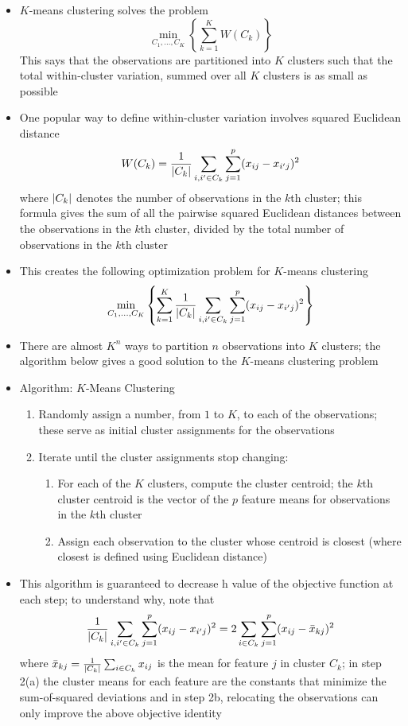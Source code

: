 \documentclass[12pt]{article}
\begin{document}
\begin{itemize}
\item $K$-means clustering solves the problem $$ \min_{C_1,\dots,C_K}\left\{ \sum_{k=1}^K W(C_k)\right\} $$ This says that the observations are partitioned into $K$ clusters such that the total within-cluster variation, summed over all $K$ clusters is as small as possible 
\item One popular way to define within-cluster variation involves squared Euclidean distance $$ W(C_k) = \frac{1}{\abs{C_k}} \sum_{i, i' \in C_k} \sum_{j=1}^p (x_{ij} - x_{i'j})^2 $$ where $\abs{C_k}$ denotes the number of observations in the $k$th cluster; this formula gives the sum of all the pairwise squared Euclidean distances between the observations in the $k$th cluster, divided by the total number of observations in the $k$th cluster 
\item This creates the following optimization problem for $K$-means clustering $$ \min_{C_1,\dots,C_K} \left\{ \sum_{k=1}^K \frac{1}{\abs{C_k}} \sum_{i, i' \in C_k} \sum_{j=1}^p (x_{ij} - x_{i'j})^2\right\} $$ 
\item There are almost $K^n$ ways to partition $n$ observations into $K$ clusters; the algorithm below gives a good solution to the $K$-means clustering problem
\item Algorithm: $K$-Means Clustering \begin{enumerate} 
\item Randomly assign a number, from $1$ to $K$, to each of the observations; these serve as initial cluster assignments for the observations 
\item Iterate until the cluster assignments stop changing: \begin{enumerate} 
\item For each of the $K$ clusters, compute the cluster centroid; the $k$th cluster centroid is the vector of the $p$ feature means for observations in the $k$th cluster 
\item Assign each observation to the cluster whose centroid is closest (where closest is defined using Euclidean distance) \end{enumerate} \end{enumerate} 
\item This algorithm is guaranteed to decrease h value of the objective function at each step; to understand why, note that 
$$ \frac{1}{\abs{C_k}} \sum_{i,i' \in C_k} \sum_{j=1}^p (x_{ij} - x_{i'j})^2 = 2 \sum_{i \in C_k}\sum_{j=1}^p (x_{ij} - \bar{x}_{kj})^2 $$ where $\bar{x}_{kj} = \frac{1}{\abs{C_k}} \sum_{i \in C_k} x_{ij} $ is the mean for feature $j$ in cluster $C_k$; in step 2(a) the cluster means for each feature are the constants that minimize the sum-of-squared deviations and in step 2b, relocating the observations can only improve the above objective identity

\end{itemize}
\end{document}
